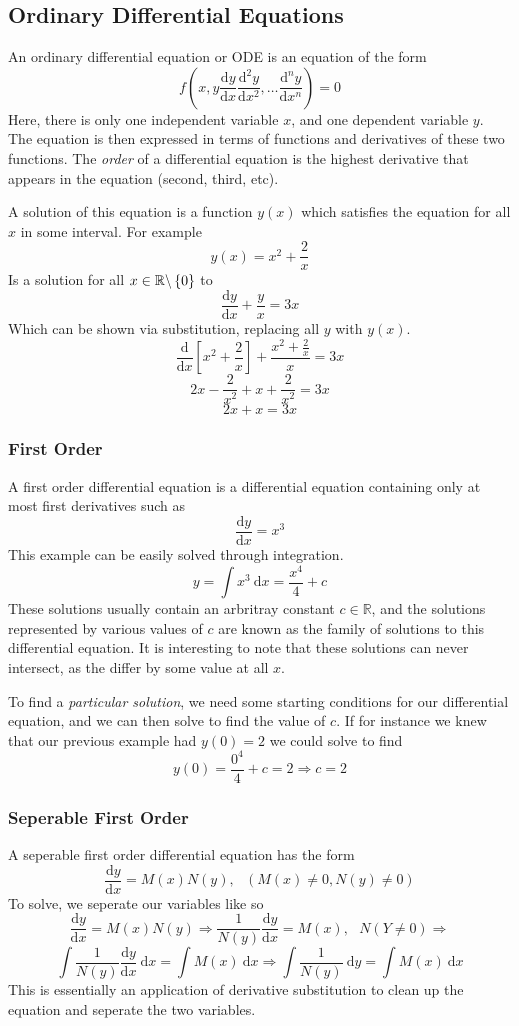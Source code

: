 \documentclass[12pt]{report}
\newcommand{\R}{\mathbb{R}}
\newcommand{\dx}{\:\mathrm{d}x}
\newcommand{\dy}{\:\mathrm{d}y}
\newcommand{\dd}[2]{\frac{\mathrm{d}#1}{\mathrm{d}#2}}
\newcommand{\mcom}{, \:\:\:}
\newcommand{\derivx}[1]{\frac{\mathrm{d}}{\mathrm{d}x}\left[#1\right]}
\begin{document}
\begin{flushleft}
\subsection*{Ordinary Differential Equations}

An ordinary differential equation or ODE is an equation of the form
\[f\left(x, y \dd{y}{x} \dd{^2y}{x^2}, \ldots \dd{^ny}{x^n}\right) = 0\]
Here, there is only one independent variable \(x\), and one dependent variable
\(y\). The equation is then expressed in terms of functions and derivatives of
these two functions. The \textit{order} of a differential equation is the
highest derivative that appears in the equation (second, third, etc). \par
A solution of this equation is a function \(y(x)\) which satisfies the equation
for all \(x\) in some interval. For example
\[y(x) = x^2 + \frac{2}{x}\]
Is a solution for all \(x\in\R\backslash\set{0}\) to
\[\dd{y}{x} + \frac{y}{x} = 3x\]
Which can be shown via substitution, replacing all \(y\) with \(y(x)\).
\[\derivx{x^2 + \frac{2}{x}} + \frac{x^2 + \frac{2}{x}}{x} = 3x\]
\[2x - \frac{2}{x^2} + x + \frac{2}{x^2} = 3x\]
\[2x + x = 3x\]

\subsubsection*{First Order}

A first order differential equation is a differential equation containing only
at most first derivatives such as
\[\dd{y}{x} = x^3\]
This example can be easily solved through integration.
\[y = \int x^3 \dx = \frac{x^4}{4} + c\]
These solutions usually contain an arbritray constant \(c\in\R\), and the
solutions represented by various values of \(c\) are known as the family of
solutions to this differential equation. It is interesting to note that these
solutions can never intersect, as the differ by some value at all \(x\). \par
To find a \textit{particular solution}, we need some starting conditions for
our differential equation, and we can then solve to find the value of \(c\).
If for instance we knew that our previous example had \(y(0) = 2\) we could
solve to find
\[y(0) = \frac{0^4}{4} + c = 2 \Rightarrow c = 2\]

\subsubsection*{Seperable First Order}

A seperable first order differential equation has the form
\[\dd{y}{x} = M(x)N(y) \mcom (M(x)\neq0, N(y)\neq0)\]
To solve, we seperate our variables like so
\[\dd{y}{x} = M(x)N(y) \Rightarrow \frac{1}{N(y)}\dd{y}{x} 
= M(x)\mcom N(Y\neq0) \Rightarrow\]
\[\int \frac{1}{N(y)}\dd{y}{x}\dx = \int M(x)\dx \Rightarrow 
\int \frac{1}{N(y)}\dy = \int M(x)\dx\]
This is essentially an application of derivative substitution to clean up the
equation and seperate the two variables.


\end{flushleft}
\end{document}
